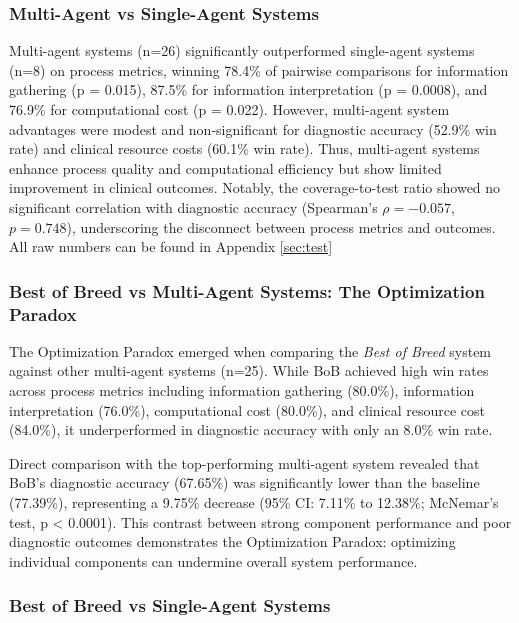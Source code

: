 \documentclass[manuscript, nonacm]{acmart}
\begin{document}
\subsubsection{\textbf{Multi-Agent vs Single-Agent Systems}}

Multi-agent systems (n=26) significantly outperformed single-agent systems (n=8) on process metrics, winning 78.4\% of pairwise comparisons for information gathering (p = 0.015), 87.5\% for information interpretation (p = 0.0008), and 76.9\% for computational cost (p = 0.022). However, multi-agent system advantages were modest and non-significant for diagnostic accuracy (52.9\% win rate) and clinical resource costs (60.1\% win rate). Thus, multi-agent systems enhance process quality and computational efficiency but show limited improvement in clinical outcomes. Notably, the coverage-to-test ratio showed no significant correlation with diagnostic accuracy (Spearman's $\rho = -0.057$, $p = 0.748$), underscoring the disconnect between process metrics and outcomes.
All raw numbers can be found in Appendix \ref{sec:test}

\subsubsection{\textbf{Best of Breed vs Multi-Agent Systems: The Optimization Paradox
}}

The Optimization Paradox emerged when comparing the \textit{Best of Breed} system against other multi-agent systems (n=25). While BoB achieved high win rates across process metrics including information gathering (80.0\%), information interpretation (76.0\%), computational cost (80.0\%), and clinical resource cost (84.0\%), it underperformed in diagnostic accuracy with only an 8.0\% win rate. 

Direct comparison with the top-performing multi-agent system revealed that BoB's diagnostic accuracy (67.65\%) was significantly lower than the baseline (77.39\%), representing a 9.75\% decrease (95\% CI: 7.11\% to 12.38\%; McNemar's test, p < 0.0001). This contrast between strong component performance and poor diagnostic outcomes demonstrates the Optimization Paradox: optimizing individual components can undermine overall system performance.

\subsubsection{\textbf{Best of Breed vs Single-Agent Systems}}
\end{document}
